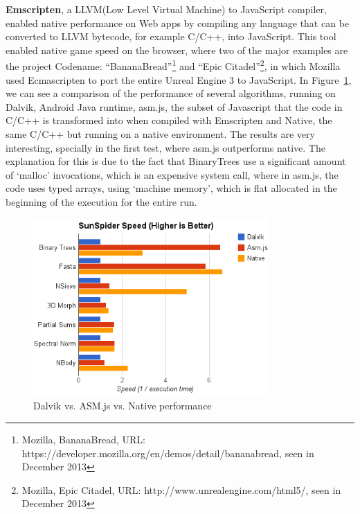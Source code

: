 \textbf{Emscripten}\cite{Zakai2011}, a LLVM(Low Level Virtual Machine) to JavaScript compiler, enabled native performance on Web apps by compiling any language that can be converted to LLVM bytecode, for example C/C++, into JavaScript. This tool enabled native game speed on the browser, where two of the major examples are the project Codename: ``BananaBread''\footnote{Mozilla, BananaBread,  URL: https://developer.mozilla.org/en/demos/detail/bananabread, seen in December 2013} and ``Epic Citadel''\footnote{Mozilla, Epic Citadel,  URL: http://www.unrealengine.com/html5/, seen in December 2013}, in which Mozilla used Ecmascripten to port the entire Unreal Engine 3 to JavaScript. In Figure~\ref{fig:dan}, we can see a comparison of the performance of several algorithms, running on Dalvik, Android Java runtime, asm.js, the subset of Javascript that the code in C/C++ is transformed into when compiled with Emscripten and Native, the same C/C++ but running on a native environment. The results are very interesting, specially in the first test, where asm.js outperforms native. The explanation for this is due to the fact that BinaryTrees use a significant amount of `malloc' invocations, which is an expensive system call, where in asm.js, the code uses typed arrays, using `machine memory', which is flat allocated in the beginning of the execution for the entire run.

\begin{figure}[hb]
  \centering
  \includegraphics[width=0.8\textwidth]{img/Dalvik-vs-ASM-vs-Native-edited}
  \caption{Dalvik vs. ASM.js vs. Native performance}
  \label{fig:dan}
\end{figure}

